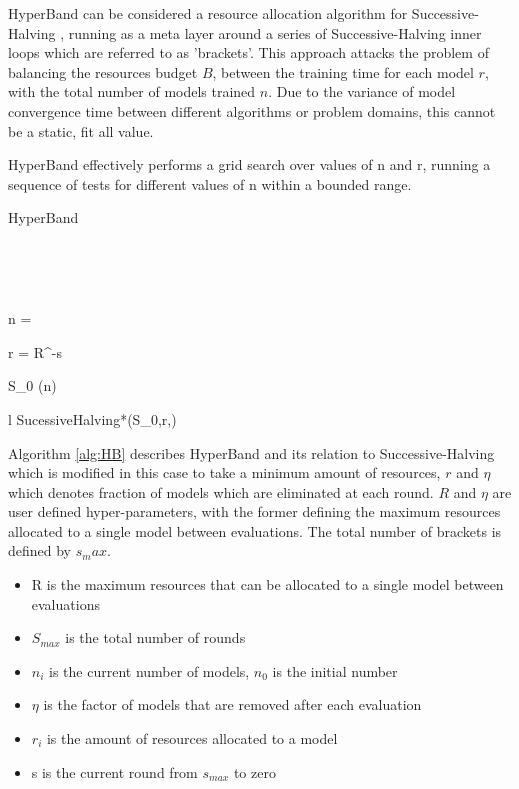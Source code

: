 \documentclass{article}
\begin{document}
		HyperBand can be considered a resource allocation algorithm for Successive-Halving \cite{SH}, running as a meta layer around a series of Successive-Halving inner loops which are referred to as 'brackets'. This approach attacks the problem of balancing the resources budget \(B\), between the training time for each model \(r\), with the total number of models trained \(n\). Due to the variance of model convergence time between different algorithms or problem domains, this cannot be a static, fit all value.

		HyperBand effectively performs a grid search over values of n and r, running a sequence of tests for different values of n within a bounded range. 



		\begin{algorithm}[H]\label{alg:HB}
			\caption{HyperBand}

			\SetAlgoLined
			\
			
			\



				{
				n = 

				r = R\eta^{-s}

				S_0 \leftarrow {}(n)

				l \leftarrow SucessiveHalving*(S_0,r,\eta)

				}

		\end{algorithm}

		Algorithm \ref{alg:HB} describes HyperBand and its relation to Successive-Halving which is modified in this case to take a minimum amount of resources, \(r\) and \(\eta\) which denotes fraction of models which are eliminated at each round. \(R\) and \(\eta\) are user defined hyper-parameters, with the former defining the maximum resources allocated to a single model between evaluations. The total number of brackets is defined by \(s_max\). 

		\begin{itemize}

			\item R is the maximum resources that can be allocated to a single model between evaluations
			\item \(S_{max}\) is the total number of rounds 
			\item \(n_i\) is the current number of models, \(n_0\) is the initial number
			\item \(\eta\) is the factor of models that are removed after each evaluation
			\item \(r_i\) is the amount of resources allocated to a model  
			\item s is the current round from \(s_{max}\) to zero

		\end{itemize}
\end{document}
